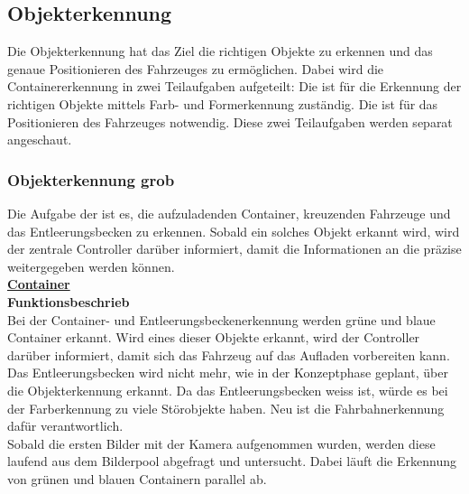 \subsection{Objekterkennung}
Die Objekterkennung hat das Ziel die richtigen Objekte zu erkennen und das genaue Positionieren des Fahrzeuges zu ermöglichen. Dabei wird die Containererkennung in zwei Teilaufgaben aufgeteilt: Die \grqq{} ist für die Erkennung der richtigen Objekte mittels Farb- und Formerkennung zuständig. Die \grqq{} ist für das Positionieren des Fahrzeuges notwendig. Diese zwei Teilaufgaben werden separat angeschaut.
%
\subsubsection{Objekterkennung grob}
Die Aufgabe der \grqq ist es, die aufzuladenden Container, kreuzenden Fahrzeuge und das Entleerungsbecken zu erkennen. Sobald ein solches Objekt erkannt wird, wird der zentrale Controller darüber informiert, damit die Informationen an die \grqq{} präzise weitergegeben werden können.
\\[0.2cm]
\underline{\textbf{Container}}
\\[0.2cm]
\textbf{Funktionsbeschrieb}\\[0.2cm]
Bei der Container- und Entleerungsbeckenerkennung werden grüne und blaue Container erkannt. Wird eines dieser Objekte erkannt, wird der Controller darüber informiert, damit sich das Fahrzeug auf das Aufladen vorbereiten kann. Das Entleerungsbecken wird nicht mehr, wie in der Konzeptphase geplant, über die Objekterkennung erkannt. Da das Entleerungsbecken weiss ist, würde es bei der Farberkennung zu viele Störobjekte haben. Neu ist die Fahrbahnerkennung dafür verantwortlich.
\\[0.2cm]
Sobald die ersten Bilder mit der Kamera aufgenommen wurden, werden diese laufend aus dem Bilderpool abgefragt und untersucht. Dabei läuft die Erkennung von grünen und blauen Containern parallel ab.
